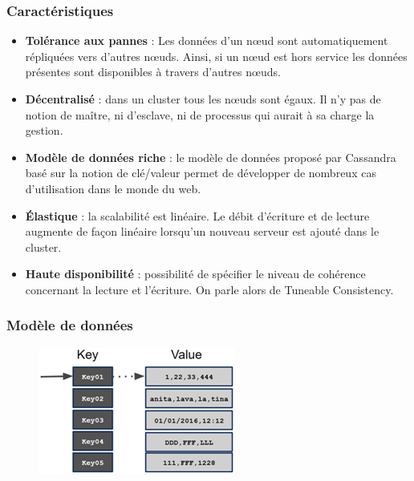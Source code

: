 \documentclass[a4paper, 11pt, titlepage]{article}
\begin{document}
\subsubsection* {Caractéristiques}


\begin{itemize}

\item
\textbf{Tolérance aux pannes} : Les données d'un nœud sont automatiquement répliquées vers d'autres nœuds. Ainsi, si un nœud est hors service les données présentes sont disponibles à travers d'autres nœuds.

\item
\textbf{Décentralisé} : dans un cluster tous les nœuds sont égaux. Il n'y pas de notion de maître, ni d'esclave, ni de processus qui aurait à sa charge la gestion.

\item
\textbf{Modèle de données riche} : le modèle de données proposé par Cassandra basé sur la notion de clé/valeur permet de développer de nombreux cas d'utilisation dans le monde du web.

\item
\textbf{Élastique} : la scalabilité est linéaire. Le débit d'écriture et de lecture augmente de façon linéaire lorsqu'un nouveau serveur est ajouté dans le cluster.

\item
\textbf{Haute disponibilité} : possibilité de spécifier le niveau de cohérence concernant la lecture et l'écriture. On parle alors de Tuneable Consistency.

\end{itemize}

\subsubsection* {Modèle de données}

\begin{figure}
\includegraphics[scale=0.6]{res/model_cass.png}
\end{figure}
\end{document}
